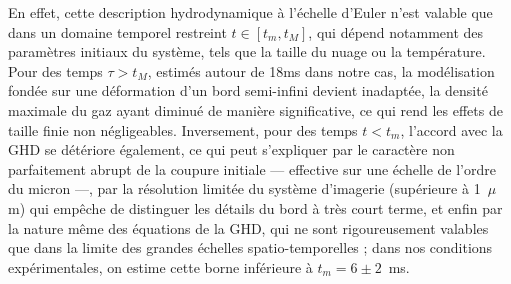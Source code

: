 
En effet, cette description hydrodynamique à l’échelle d’Euler n’est valable que dans un domaine temporel restreint $t\in [t_m, t_M]$, qui dépend notamment des paramètres initiaux du système, tels que la taille du nuage ou la température. Pour des temps $\tau > t_M$, estimés autour de 18ms dans notre cas, la modélisation fondée sur une déformation d’un bord semi-infini devient inadaptée, la densité maximale du gaz ayant diminué de manière significative, ce qui rend les effets de taille finie non négligeables. Inversement, pour des temps $t < t_m$, l’accord avec la GHD se détériore également, ce qui peut s’expliquer par le caractère non parfaitement abrupt de la coupure initiale — effective sur une échelle de l’ordre du micron —, par la résolution limitée du système d’imagerie (supérieure à 1~$\mu$m) qui empêche de distinguer les détails du bord à très court terme, et enfin par la nature même des équations de la GHD, qui ne sont rigoureusement valables que dans la limite des grandes échelles spatio-temporelles ; dans nos conditions expérimentales, on estime cette borne inférieure à $t_m = 6 \pm 2$~ms.

